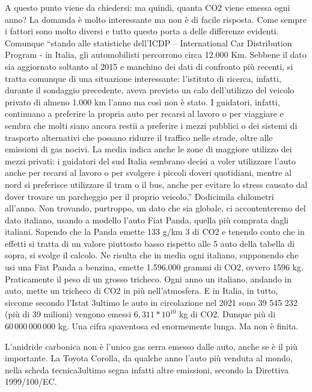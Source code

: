 A questo punto viene da chiedersi: ma quindi, quanta CO2 viene emessa ogni anno? La domanda è molto interessante ma non è di facile risposta. Come sempre i fattori sono molto diversi e tutto questo porta a delle differenze evidenti. Comunque “stando alle statistiche dell'ICDP – International Car Distribution Program - in Italia, gli automobilisti percorrono circa 12.000 Km. Sebbene il dato sia aggiornato soltanto al 2015 e manchino dei dati di confronto più recenti, si tratta comunque di una situazione interessante: l'istituto di ricerca, infatti, durante il sondaggio precedente, aveva previsto un calo dell'utilizzo del veicolo privato di almeno 1.000 km l'anno ma così non è stato. I guidatori, infatti, continuano a preferire la propria auto per recarsi al lavoro o per viaggiare e sembra che molti siano ancora restii a preferire i mezzi pubblici o dei sistemi di trasporto alternativi che possano ridurre il traffico nelle strade, oltre alle emissioni di gas nocivi. La media indica anche le zone di maggiore utilizzo dei mezzi privati: i guidatori del sud Italia sembrano decisi a voler utilizzare l'auto anche per recarsi al lavoro o per svolgere i piccoli doveri quotidiani, mentre al nord si preferisce utilizzare il tram o il bus, anche per evitare lo stress causato dal dover trovare un parcheggio per il proprio veicolo.”  Dodicimila chilometri all’anno. Non trovando, purtroppo, un dato che sia globale, ci accontenteremo del dato italiano, usando a modello l’auto Fiat Panda, quella più comprata dagli italiani. Sapendo che la Panda emette 133 g/km 3 di CO2 e tenendo conto che in effetti si tratta di un valore piuttosto basso rispetto alle 5 auto della tabella di sopra, si svolge il calcolo. Ne risulta che in media ogni italiano, supponendo che usi una Fiat Panda a benzina, emette 1.596.000 grammi di CO2, ovvero 1596 kg.  Praticamente il peso di un grosso tricheco. Ogni anno un italiano, andando in auto, mette un tricheco di CO2 in più nell’atmosfera. E in Italia, in tutto, siccome secondo l’Istat 3ultimo le auto in circolazione nel 2021 sono 39 545 232 (più di 39 milioni) vengono emessi $6,311*10^{10}$ kg di CO2. Dunque più di $60\,000\,000\,000$ kg. Una cifra spaventosa ed enormemente lunga. Ma non è finita.

L’anidride carbonica non è l’unico gas serra emesso dalle auto, anche se è il più importante. La Toyota Corolla, da qualche anno l’auto più venduta al mondo, nella scheda tecnica3ultimo segna infatti altre emissioni, secondo la Direttiva 1999/100/EC.
\newpage